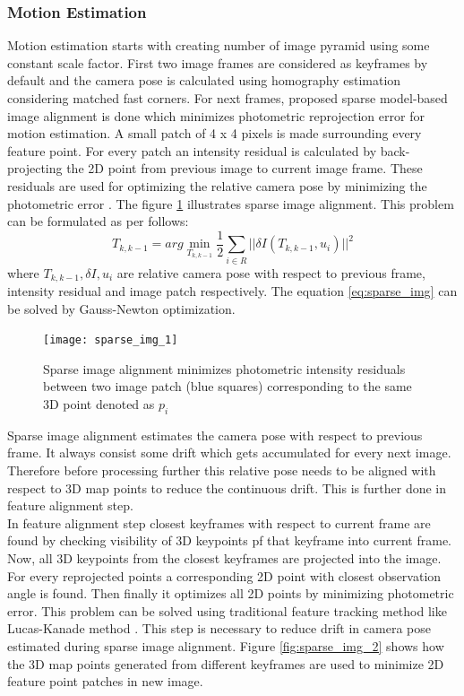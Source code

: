 \subsubsection{Motion Estimation}
Motion estimation starts with creating number of image pyramid using some constant scale factor. First two image frames are considered as keyframes by default and the camera pose is calculated using homography estimation considering matched \acrshort{fast} corners. For next frames, proposed sparse model-based image alignment is done which minimizes photometric reprojection error for motion estimation. A small patch of 4 x 4 pixels is made surrounding every feature point. For every patch an intensity residual is calculated by back-projecting the 2D point from previous image to current image frame. These residuals are used for optimizing the relative camera pose by minimizing the photometric error \cite{Forster2014ICRA}. The figure \ref{fig:sparse_img_1} illustrates sparse image alignment. This problem can be formulated as per follows:
\begin{equation*}
T_{k,k-1} = arg \min\limits_{T_{k,k-1}} \frac{1}{2} \sum\limits_{i \in R} || \delta I (T_{k,k-1}, u_{i})||^{2}
\label{eq:sparse_img}
\end{equation*}
\noindent where $T_{k,k-1}, \delta I, u_{i} $ are relative camera pose with respect to previous frame, intensity residual and image patch respectively. The equation \ref{eq:sparse_img} can be solved by Gauss-Newton optimization.
\begin{figure}[H]
	\centering
	\texttt{[image: sparse\_img\_1]}
	\caption{Sparse image alignment minimizes photometric intensity residuals between two image patch (blue squares) corresponding to the same 3D point denoted as $ p_{i}$ \cite{Forster2014ICRA}}
	\label{fig:sparse_img_1}
\end{figure}
\noindent Sparse image alignment estimates the camera pose with respect to previous frame. It always consist some drift which gets accumulated for every next image. Therefore before processing further this relative pose needs to be aligned with respect to 3D map points to reduce the continuous drift. This is further done in feature alignment step. \\
\newline In feature alignment step closest keyframes with respect to current frame are found by checking visibility of 3D keypoints pf that keyframe into current frame. Now, all 3D keypoints from the closest keyframes are projected into the image. For every reprojected points a corresponding 2D point with closest observation angle is found. Then finally it optimizes all 2D points by minimizing photometric error. This problem can be solved using traditional feature tracking method like Lucas-Kanade method \cite{Lucas81}. This step is necessary to reduce drift in camera pose estimated during sparse image alignment. Figure \ref{fig:sparse_img_2}  shows how the 3D map points generated from different keyframes are used to minimize 2D feature point patches in new image.\\
